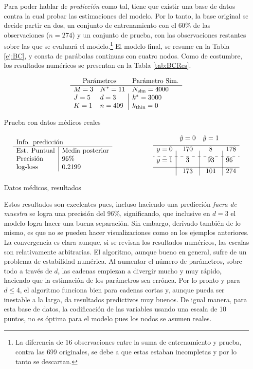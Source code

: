 \documentclass[../Main/Main.tex]{subfiles}
\begin{document}
Para poder hablar de \textit{predicción} como tal, tiene que existir una base de datos contra la cual probar las estimaciones del modelo. Por lo tanto, la base original se decide partir en dos, un conjunto de entrenamiento con el $60\%$ de las observaciones ($n=274$) y un conjunto de prueba, con las observaciones restantes sobre las que se evaluará el modelo.\footnote{La diferencia de 16 observaciones entre la suma de entrenamiento y prueba, contra las 699 originales, se debe a que estas estaban incompletas y por lo tanto se descartan.} El modelo final, se resume en la Tabla \ref{ej:BC}, y consta de parábolas continuas con cuatro nodos. Como de costumbre, los resultados numéricos se presentan en la Tabla \ref{tab:BCRes}.
\begin{table}[h]
$$\paramsmod{3}{5}{1}{11}{3}{409}{4000}{3000}{0}$$
\caption{Prueba con datos médicos reales}
\label{ej:BC}
\end{table}

\begin{table}
\begin{align*}
\resultados{\text{Media posterior}}{96}{0.2199}
\qquad\qquad\qquad
\matconf{170}{8}{178}{3}{93}{96}{173}{101}{274}
\end{align*}
\caption{Datos médicos, resultados}
\label{tab:BCRes}
\end{table}

Estos resultados son excelentes pues, incluso haciendo una predicción \textit{fuera de muestra} se logra una precisión del $96\%$, significando, que inclusive en $d=3$ el modelo logra hacer una buena separación. Sin embargo, derivado también de lo mismo, es que no se pueden hacer visualizaciones como en los ejemplos anteriores. La convergencia es clara aunque, si se revisan los resultados numéricos, las escalas son relativamente arbitrarias. El algoritmo, aunque bueno en general, sufre de un problema de estabilidad numérica. Al aumentar el número de parámetros, sobre todo a través de $d$, las cadenas empiezan a divergir mucho y muy rápido, haciendo que la estimación de los parámetros sea errónea. Por lo pronto y para $d\leq4$, el algoritmo funciona bien para cadenas cortas y, aunque pueda ser inestable a la larga, da resultados predictivos muy buenos. De igual manera, para esta base de datos, la codificación de las variables usando una escala de 10 puntos, no es óptima para el modelo pues los nodos se asumen reales. 
\end{document}
